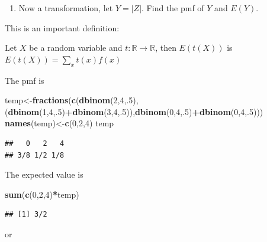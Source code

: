 \documentclass[]{book}
\newenvironment{Shaded}{\begin{snugshade}}{\end{snugshade}}
\newcommand{\KeywordTok}[1]{\textcolor[rgb]{0.13,0.29,0.53}{\textbf{#1}}}
\newcommand{\DecValTok}[1]{\textcolor[rgb]{0.00,0.00,0.81}{#1}}
\newcommand{\OperatorTok}[1]{\textcolor[rgb]{0.81,0.36,0.00}{\textbf{#1}}}
\newcommand{\NormalTok}[1]{#1}
\providecommand{\tightlist}{%
  \setlength{\itemsep}{0pt}\setlength{\parskip}{0pt}}
\theoremstyle{definition}
\theoremstyle{definition}
\theoremstyle{definition}
\theoremstyle{remark}
\begin{document}
\begin{enumerate}
\def\labelenumi{\arabic{enumi}.}
\setcounter{enumi}{1}
\tightlist
\item
  Now a transformation, let \(Y=|Z|\). Find the pmf of \(Y\) and
  \(E(Y)\).
\end{enumerate}

This is an important definition:

Let \(X\) be a random variable and
\(t:\mathbb{R}\rightarrow \mathbb{R}\), then \(E(t(X))\) is
\(E(t(X))=\sum_{x}t(x)f(x)\)

The pmf is

\begin{Shaded}
\begin{Highlighting}[]
\NormalTok{temp<-}\KeywordTok{fractions}\NormalTok{(}\KeywordTok{c}\NormalTok{(}\KeywordTok{dbinom}\NormalTok{(}\DecValTok{2}\NormalTok{,}\DecValTok{4}\NormalTok{,.}\DecValTok{5}\NormalTok{),(}\KeywordTok{dbinom}\NormalTok{(}\DecValTok{1}\NormalTok{,}\DecValTok{4}\NormalTok{,.}\DecValTok{5}\NormalTok{)}\OperatorTok{+}\KeywordTok{dbinom}\NormalTok{(}\DecValTok{3}\NormalTok{,}\DecValTok{4}\NormalTok{,.}\DecValTok{5}\NormalTok{)),}\KeywordTok{dbinom}\NormalTok{(}\DecValTok{0}\NormalTok{,}\DecValTok{4}\NormalTok{,.}\DecValTok{5}\NormalTok{)}\OperatorTok{+}\KeywordTok{dbinom}\NormalTok{(}\DecValTok{0}\NormalTok{,}\DecValTok{4}\NormalTok{,.}\DecValTok{5}\NormalTok{)))}
\KeywordTok{names}\NormalTok{(temp)<-}\KeywordTok{c}\NormalTok{(}\DecValTok{0}\NormalTok{,}\DecValTok{2}\NormalTok{,}\DecValTok{4}\NormalTok{)}
\NormalTok{temp}
\end{Highlighting}
\end{Shaded}

\begin{verbatim}
##   0   2   4 
## 3/8 1/2 1/8
\end{verbatim}

The expected value is

\begin{Shaded}
\begin{Highlighting}[]
\KeywordTok{sum}\NormalTok{(}\KeywordTok{c}\NormalTok{(}\DecValTok{0}\NormalTok{,}\DecValTok{2}\NormalTok{,}\DecValTok{4}\NormalTok{)}\OperatorTok{*}\NormalTok{temp)}
\end{Highlighting}
\end{Shaded}

\begin{verbatim}
## [1] 3/2
\end{verbatim}

or
\end{document}
